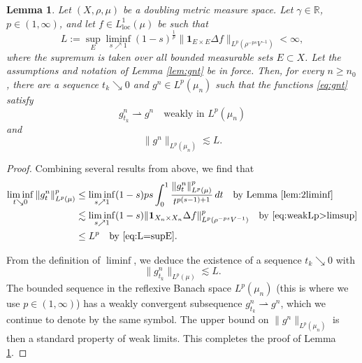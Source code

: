 \documentclass[11pt]{amsart}
\newtheorem{lemma}[theorem]{Lemma}
\theoremstyle{definition}
\theoremstyle{remark}
\numberwithin{equation}{section}
\newcommand{\Norm}[2]{\|#1\|_{#2}}
\def\gfz{\genfrac{}{}{0pt}{}}
\begin{document}
\begin{lemma}\label{lem:weakLp>liminf}
Let $(X,\rho,\mu)$ be a doubling metric measure space.
Let $\gamma\in\mathbb R$, $p\in(1,\infty)$, and let
$f\in L^1_{\mathrm{loc}}(\mu)$ be such that
\begin{equation}\label{eq:L=supE}
  L:=%
  \sup_E\liminf_{s\nearrow 1}(1-s)^{\frac1p}
  \Norm{\mathbf{1}_{E\times E}\Delta f}{L^p(\rho^{-ps}V^{-1})}<\infty,
\end{equation}
where the supremum is taken over all bounded measurable sets $E\subset X$.
Let the assumptions and notation of Lemma \ref{lem:gnt} be in force.
Then, for every $n\geq n_0$, there are a sequence $t_k\searrow 0$ and $g^n\in L^p(\mu_n)$ such
that the functions \eqref{eq:gnt} satisfy
\begin{equation*}
  g^n_{t_k}\rightharpoonup g^n\quad\text{weakly in }L^p(\mu_n)
\end{equation*}
and
\begin{equation*}
  \Norm{g^n}{L^p(\mu_n)}\lesssim L.
\end{equation*}
\end{lemma}

\begin{proof}
Combining several results from above, we find that
\begin{equation*}
\begin{split}
  \liminf_{t\searrow 0}\Norm{g^n_t}{L^p(\mu)}^p
  &\leq\liminf_{s\nearrow 1}(1-s)ps\int_0^1\frac{\Norm{g^n_t}{L^p(\mu)}^p}{t^{p(s-1)+1}}\,dt
  \quad\text{by Lemma \ref{lem:2liminf}} \\
&  \lesssim \liminf_{s\nearrow 1}(1-s)
   \Norm{ \mathbf{1}_{X_n\times X_n}\Delta f }{ L^p(\rho^{-ps}V^{-1})}^p
  \quad\text{by \eqref{eq:weakLp>limsup}} \\
& \leq L^p\quad\text{by \eqref{eq:L=supE}}.
\end{split}
\end{equation*}

From the definition of $\liminf$, we deduce the existence of a sequence $t_k\searrow 0$ with
\begin{equation*}
   \Norm{g^n_{t_k}}{L^p(\mu)}
 \lesssim L.
\end{equation*}
The bounded sequence in the reflexive Banach space $L^p(\mu_n)$ (this is where we use
$p\in(1,\infty)$) has a weakly convergent subsequence $g^n_{t_k}\rightharpoonup g^n$, which
we continue to denote by the same symbol. The upper bound on $\Norm{g^n}{L^p(\mu_n)}$ is then a
standard property of weak limits.
This completes the proof of Lemma \ref{lem:weakLp>liminf}.
\end{proof}
\end{document}
